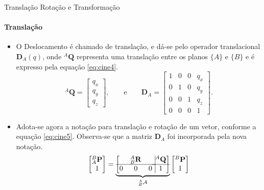 \documentclass{beamer}
\begin{document}
\begin{frame}{{Translação Rotação e Transformação}}
    \framesubtitle{Translação}
    \begin{itemize}
        \item O Deslocamento é chamado de translação, e dá-se pelo operador translacional $\mathbf{D}_A(q)$, onde ${}^A\mathbf{Q}$ representa uma translação entre os planos $\{A\}$ e $\{B\}$ e é expresso pela equação \eqref{eq:cine4}.
        \begin{equation}\label{eq:cine4}
        {}^A\mathbf{Q} =
        \begin{bmatrix}
        q_x\\ q_y \\ q_z
        \end{bmatrix}, \qquad \mathrm{e} \qquad
        \mathbf{D}_A = 
        \begin{bmatrix}
        1 & 0 & 0 & q_x\\
        0 & 1 & 0 & q_y\\
        0 & 0 & 1 & q_z\\
        0 & 0 & 0 & 1
        \end{bmatrix}.
        \end{equation}
    \item Adota-se agora a notação para translação e rotação de um vetor, conforme a equação \eqref{eq:cine5}. Observa-se que a matriz $\mathbf{D}_A$ foi incorporada pela nova notação.
        \begin{equation}\label{eq:cine5}
        \begin{bmatrix}
        {}^B_A\mathbf{P}\\ 1
        \end{bmatrix}
        =
        \underbrace {
        \left[
        \begin{matrix}
        & {}_B^A\mathbf{R}& \\ \hline
        0 & 0 & 0\\
        \end{matrix} \right.
        \left.
        \vline
        \begin{matrix}
        {}^A\mathbf{Q}\\ \hline
        1
        \end{matrix} \right]
        }_{{}^A_B\mathcal{A}}
        \begin{bmatrix}
        {}^B\mathbf{P}\\
        1
        \end{bmatrix}
        \end{equation}
    \end{itemize}
\end{frame}
\end{document}
